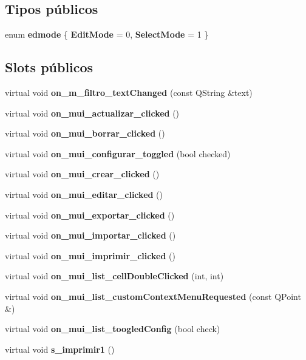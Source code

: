 \subsection*{Tipos p\'{u}blicos}
\begin{CompactItemize}
\item 
enum {\bf edmode} \{ {\bf Edit\-Mode} =  0, 
{\bf Select\-Mode} =  1
 \}
\end{CompactItemize}
\subsection*{Slots p\'{u}blicos}
\begin{CompactItemize}
\item 
virtual void {\bf on\_\-m\_\-filtro\_\-text\-Changed} (const QString \&text)\label{classArticuloList_i0}

\item 
virtual void {\bf on\_\-mui\_\-actualizar\_\-clicked} ()\label{classArticuloList_i1}

\item 
virtual void {\bf on\_\-mui\_\-borrar\_\-clicked} ()\label{classArticuloList_i2}

\item 
virtual void {\bf on\_\-mui\_\-configurar\_\-toggled} (bool checked)\label{classArticuloList_i3}

\item 
virtual void {\bf on\_\-mui\_\-crear\_\-clicked} ()\label{classArticuloList_i4}

\item 
virtual void {\bf on\_\-mui\_\-editar\_\-clicked} ()\label{classArticuloList_i5}

\item 
virtual void {\bf on\_\-mui\_\-exportar\_\-clicked} ()\label{classArticuloList_i6}

\item 
virtual void {\bf on\_\-mui\_\-importar\_\-clicked} ()\label{classArticuloList_i7}

\item 
virtual void {\bf on\_\-mui\_\-imprimir\_\-clicked} ()\label{classArticuloList_i8}

\item 
virtual void {\bf on\_\-mui\_\-list\_\-cell\-Double\-Clicked} (int, int)\label{classArticuloList_i9}

\item 
virtual void {\bf on\_\-mui\_\-list\_\-custom\-Context\-Menu\-Requested} (const QPoint \&)\label{classArticuloList_i10}

\item 
virtual void {\bf on\_\-mui\_\-list\_\-toogled\-Config} (bool check)\label{classArticuloList_i11}

\item 
virtual void {\bf s\_\-imprimir1} ()\label{classArticuloList_i12}

\end{CompactItemize}
